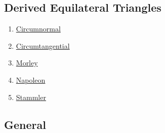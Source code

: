 \documentclass[]{article}
\providecommand{\tightlist}{%
  \setlength{\itemsep}{0pt}\setlength{\parskip}{0pt}}
\begin{document}
\hypertarget{derived-equilateral-triangles}{%
\subsection{Derived Equilateral Triangles}\label{derived-equilateral-triangles}}

\begin{enumerate}
\def\labelenumi{\arabic{enumi}.}
\tightlist
\item
  \href{http://mathworld.wolfram.com/CircumnormalTriangle.html}{Circumnormal}
\item
  \href{http://mathworld.wolfram.com/CircumtangentialTriangle.html}{Circumtangential}
\item
  \href{http://mathworld.wolfram.com/FirstMorleyTriangle.html}{Morley}
\item
  \href{http://mathworld.wolfram.com/OuterNapoleonTriangle.html}{Napoleon}
\item
  \href{http://mathworld.wolfram.com/StammlerTriangle.html}{Stammler}
\end{enumerate}

\hypertarget{general}{%
\subsection{General}\label{general}}
\end{document}
